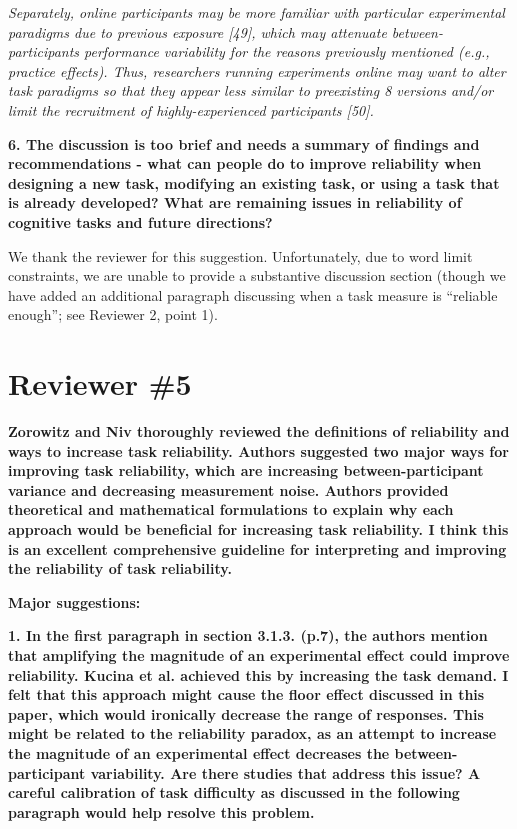 \documentclass[a4paper,12pt]{article}
\begin{document}
\begin{displayquote}
    \textit{Separately, online participants may be more familiar with particular experimental paradigms due to previous exposure [49], which may attenuate between-participants performance variability for the reasons previously mentioned (e.g., practice effects). Thus, researchers running experiments online may want to alter task paradigms so that they appear less similar to preexisting 8 versions and/or limit the recruitment of highly-experienced participants [50].}
\end{displayquote}

\textbf{6. The discussion is too brief and needs a summary of findings and recommendations - what can people do to improve reliability when designing a new task, modifying an existing task, or using a task that is already developed? What are remaining issues in reliability of cognitive tasks and future directions?}

We thank the reviewer for this suggestion. Unfortunately, due to word limit constraints, we are unable to provide a substantive discussion section (though we have added an additional paragraph discussing when a task measure is ``reliable enough''; see Reviewer 2, point 1).

\section*{Reviewer \#5}

\textbf{Zorowitz and Niv thoroughly reviewed the definitions of reliability and ways to increase task reliability. Authors suggested two major ways for improving task reliability, which are increasing between-participant variance and decreasing measurement noise. Authors provided theoretical and mathematical formulations to explain why each approach would be beneficial for increasing task reliability. I think this is an excellent comprehensive guideline for interpreting and improving the reliability of task reliability.}

\textbf{Major suggestions:}

\textbf{1. In the first paragraph in section 3.1.3. (p.7), the authors mention that amplifying the magnitude of an experimental effect could improve reliability. Kucina et al. achieved this by increasing the task demand. I felt that this approach might cause the floor effect discussed in this paper, which would ironically decrease the range of responses. This might be related to the reliability paradox, as an attempt to increase the magnitude of an experimental effect decreases the between-participant variability. Are there studies that address this issue? A careful calibration of task difficulty as discussed in the following paragraph would help resolve this problem.}
\end{document}
